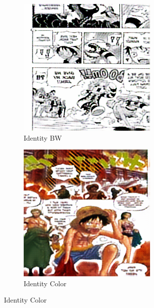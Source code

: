 \begin{figure}
    \centering

    \begin{subfigure}[b]{0.3\textwidth}
        \includegraphics[width=\textwidth]{chapter/output/epoch100_idt_B.png}
       \caption{Identity BW}
    \end{subfigure}
    \hfill
    \begin{subfigure}[b]{0.3\textwidth}
        \includegraphics[width=\textwidth]{chapter/output/epoch100_idt_A.png}
        \caption{Identity Color}
    \end{subfigure}

\end{figure}



